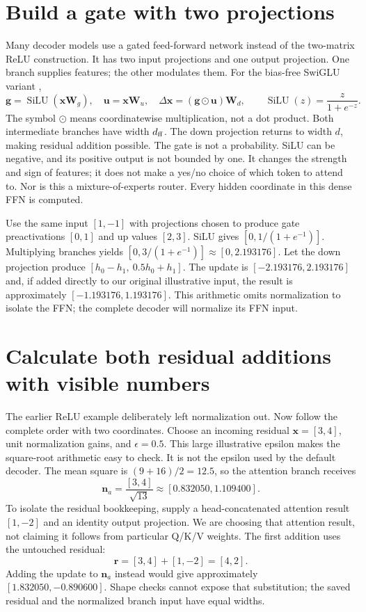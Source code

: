 \section{Build a gate with two projections}
Many decoder models use a gated feed-forward network instead of the
two-matrix ReLU construction. It has two input projections and one output
projection. One branch supplies features; the other modulates them.
For the bias-free SwiGLU variant \cite{shazeer2020glu},
\[
 \mathbf g=\operatorname{SiLU}(\mathbf x\mathbf W_g),\quad
 \mathbf u=\mathbf x\mathbf W_u,\quad
 \Delta\mathbf x=(\mathbf g\odot\mathbf u)\mathbf W_d,
 \qquad \operatorname{SiLU}(z)=\frac{z}{1+e^{-z}}.
\]
The symbol $\odot$ means coordinatewise multiplication, not a dot
product. Both intermediate branches have width $d_{\rm ff}$. The down
projection returns to width $d$, making residual addition possible.
The gate is not a probability. SiLU can be negative, and its positive
output is not bounded by one. It changes the strength and sign of
features; it does not make a yes/no choice of which token to attend to.
Nor is this a mixture-of-experts router. Every hidden coordinate in this
dense FFN is computed.

Use the same input $[1,-1]$ with projections chosen to produce
gate preactivations $[0,1]$ and up values $[2,3]$. SiLU gives
$[0,1/(1+e^{-1})]$. Multiplying branches yields
$[0,3/(1+e^{-1})]\approx[0,2.193176]$.
Let the down projection produce $[h_0-h_1,\ 0.5h_0+h_1]$. The update is
$[-2.193176,2.193176]$ and, if added directly to our original illustrative
input, the result is approximately $[-1.193176,1.193176]$.
This arithmetic omits normalization to isolate the FFN; the complete
decoder will normalize its FFN input.

\section{Calculate both residual additions with visible numbers}
The earlier ReLU example deliberately left normalization out. Now follow
the complete order with two coordinates. Choose an incoming residual
$\mathbf x=[3,4]$, unit normalization gains, and $\epsilon=0.5$.
This large illustrative epsilon makes the square-root arithmetic easy to
check. It is not the epsilon used by the default decoder.
The mean square is $(9+16)/2=12.5$, so the attention branch receives
\[
 \mathbf n_a=\frac{[3,4]}{\sqrt{13}}
 \approx[0.832050,1.109400].
\]
To isolate the residual bookkeeping, supply a head-concatenated attention
result $[1,-2]$ and an identity output projection. We are choosing that
attention result, not claiming it follows from particular Q/K/V weights.
The first addition uses the untouched residual:
\[
 \mathbf r=[3,4]+[1,-2]=[4,2].
\]
Adding the update to $\mathbf n_a$ instead would give approximately
$[1.832050,-0.890600]$. Shape checks cannot expose that substitution;
the saved residual and the normalized branch input have equal widths.

